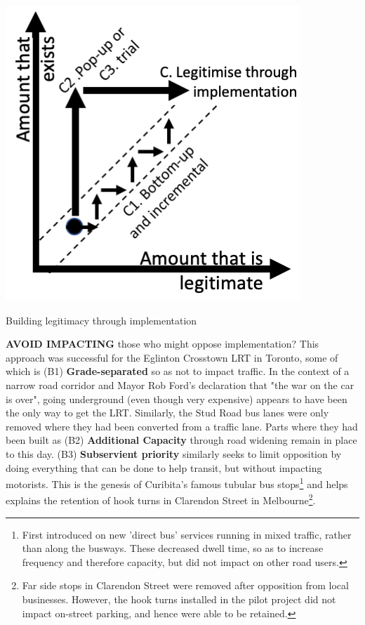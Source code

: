 \documentclass{tufte-handout}
\begin{document}
\begin{marginfigure}%
  \includegraphics[width=\linewidth]{Figure4}
  \caption{Building legitimacy through implementation}
  \label{fig:FIgure4}
\end{marginfigure}

 \textbf{AVOID IMPACTING} those who might oppose implementation?  This approach was successful for the Eglinton Crosstown LRT in Toronto, some of which is (B1) \textbf{Grade-separated} so as not to impact traffic. In the context of a narrow road corridor and Mayor Rob Ford's declaration that "the war on the car is over"\cite{Kalinowski:2010ab}, going underground (even though very expensive) appears to have been the only way to get the LRT. Similarly,  the Stud Road bus lanes were only removed where they had been converted from a traffic lane. Parts where they had been built as (B2) \textbf{Additional Capacity} through road widening remain in place to this day.  (B3) \textbf{Subservient priority} similarly seeks to limit opposition  by doing everything that can be done to help transit, but without impacting motorists. This is the genesis of Curibita's famous tubular bus stops\footnote{First introduced on new 'direct bus' services running in mixed traffic, rather than along the busways. These decreased dwell time, so as to increase frequency and therefore capacity, but did not impact on other road users.} and helps explains the retention of hook turns in Clarendon Street in Melbourne\footnote{Far side stops in Clarendon Street were removed after opposition from local businesses. However, the hook turns installed in the pilot project did not impact on-street parking, and hence were able to be retained.}. 
\end{document}
